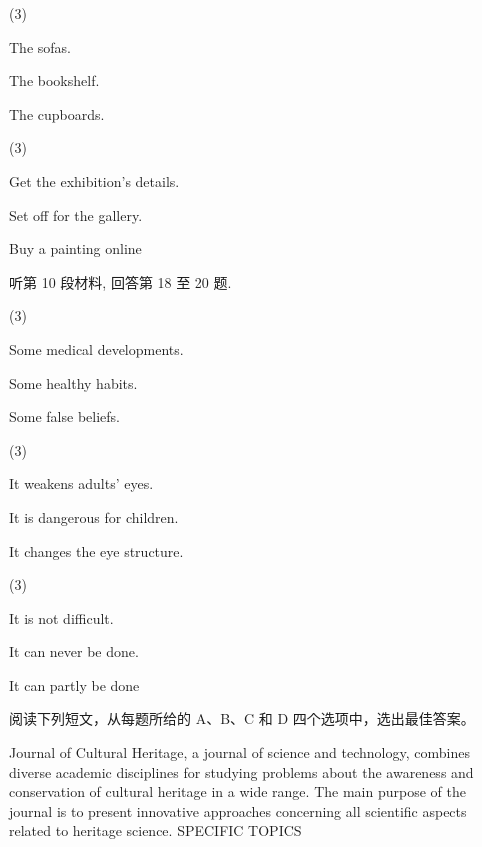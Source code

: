 \documentclass{英语试卷}
\begin{document}
\begin{choices}(3)
  \item The sofas.
  \item The bookshelf.
  \item The cupboards.
\end{choices}
\begin{choices}(3)
  \item Get the exhibition's details.
  \item Set off for the gallery.
  \item Buy a painting online
\end{choices}
\par 听第 10 段材料, 回答第 18 至 20 题.\par
{}
\begin{choices}(3)
  \item Some medical developments.
  \item Some healthy habits.
  \item Some false beliefs.
\end{choices}
\begin{choices}(3)
  \item It weakens adults' eyes.
  \item It is dangerous for children.
  \item It changes the eye structure.
\end{choices}
\begin{choices}(3)
  \item It is not difficult.
  \item It can never be done.
  \item It can partly be done
\end{choices}
\par 阅读下列短文，从每题所给的 A、B、C 和 D 四个选项中，选出最佳答案。\par
{}
\par Journal of Cultural Heritage, a journal of science and technology, combines diverse academic disciplines for studying problems about the awareness and conservation of cultural heritage in a wide range. The main purpose of the journal is to present innovative approaches concerning all scientific aspects related to heritage science. SPECIFIC TOPICS\par
\end{document}

